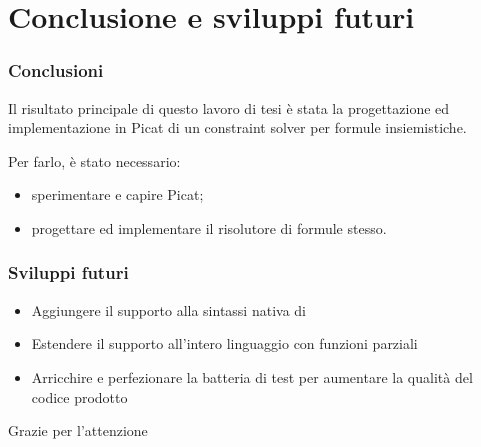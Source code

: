 \documentclass{beamer}
\begin{document}
\section{Conclusione e sviluppi futuri}

\begin{frame}
  \frametitle{Conclusioni} Il risultato principale di questo lavoro di
  tesi è stata la progettazione ed implementazione in Picat di un
  constraint solver per formule insiemistiche.
  
  \bigskip
  
  Per farlo, è stato necessario:
  \begin{itemize}
  \item sperimentare e capire Picat;
  \item progettare ed implementare il risolutore di formule stesso.
  \end{itemize}
\end{frame}


\begin{frame}
  \frametitle{Sviluppi futuri}
  \begin{itemize}
  \item Aggiungere il supporto alla sintassi nativa di \lset{}
  \item Estendere il supporto all'intero linguaggio \lset{} con funzioni parziali
  \item Arricchire e perfezionare la batteria di test per aumentare la
    qualità del codice prodotto
  \end{itemize}
\end{frame}


\begin{frame}
  \Huge{\centerline{Grazie per l'attenzione}}
\end{frame}

\end{document}
